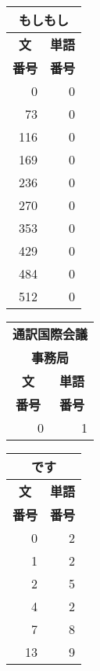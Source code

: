 \begin{figure}[hbt]
\begin{center}
\begin{footnotesize}
	\begin{minipage}[t]{3cm}
	\begin{tabular}[t]{|r|r|}
	\multicolumn{2}{c}{\bf もしもし}\\
	\hline
	\multicolumn{1}{|c|}{\bf 文} & \multicolumn{1}{c|}{\bf 単語}\\
	\multicolumn{1}{|c|}{\bf 番号} & \multicolumn{1}{c|}{\bf 番号}\\
	\hline
	0 & 0\\
	73 & 0\\
	116 & 0\\
	169 & 0\\
	236 & 0\\
	270 & 0\\
	353 & 0\\
	429 & 0\\
	484 & 0\\
	512 & 0\\
	\end{tabular}
	\end{minipage} \quad
	\begin{minipage}[t]{3cm}
	\begin{tabular}[t]{|r|r|}
	\multicolumn{2}{c}{\bf 通訳国際会議}\\
	\multicolumn{2}{c}{\bf 事務局}\\
	\hline
	\multicolumn{1}{|c|}{\bf 文} & \multicolumn{1}{c|}{\bf 単語}\\
	\multicolumn{1}{|c|}{\bf 番号} & \multicolumn{1}{c|}{\bf 番号}\\
	\hline
	0 & 1\\
	\hline
	\end{tabular}
	\end{minipage} \quad
	\begin{minipage}[t]{3cm}
	\begin{tabular}[t]{|r|r|}
	\multicolumn{2}{c}{\bf です}\\
	\hline
	\multicolumn{1}{|c|}{\bf 文} & \multicolumn{1}{c|}{\bf 単語}\\
	\multicolumn{1}{|c|}{\bf 番号} & \multicolumn{1}{c|}{\bf 番号}\\
	\hline
	0 & 2\\
	1 & 2\\
	2 & 5\\
	4 & 2\\
	7 & 8\\
	13 & 9\\

\end{tabular}
\end{minipage}
\end{footnotesize}
\end{center}
\end{figure}
